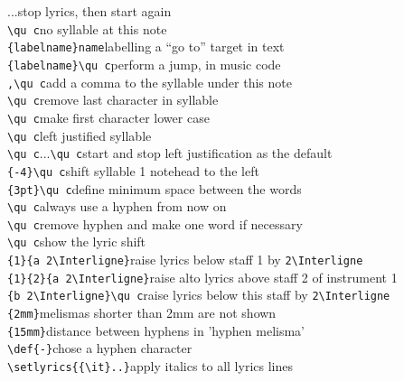 \documentclass[twoside]{article}
\begin{document}
\begin{tabbing}
...\>stop lyrics, then start again\\
\verb|\qu c|\>no syllable at this note\\[.8ex]
\verb|{labelname}name|\>labelling a ``go to'' target in text\\
\verb|{labelname}\qu c|\>perform a jump, in music code\\[.8ex]
\verb|,\qu c|\>add a comma to the syllable under this note\\
\verb|\qu c|\>remove last character in syllable\\
\verb|\qu c|\>make first character lower case\\
\verb|\qu c|\>left justified syllable\\
\verb|\qu c|...\verb|\qu c|\>start and stop left justification as the default\\
\verb|{-4}\qu c|\>shift syllable 1 notehead to the left\\[.8ex]
\verb|{3pt}\qu c|\>define minimum space between the words\\
\verb|\qu c|\>always use a hyphen from now on\\
\verb|\qu c|\>remove hyphen and make one word if necessary \\
\verb|\qu c|\>show the lyric shift\\[.8ex]
\verb|{1}{a 2\Interligne}|\>raise lyrics below staff 1 by \verb|2\Interligne|\\
\verb|{1}{2}{a 2\Interligne}|\>raise alto lyrics above staff 2 of instrument 1\\
\verb|{b 2\Interligne}\qu c|\>raise lyrics below this staff by \verb|2\Interligne|\\[.8ex]
\verb|{2mm}|\>melismas shorter than 2mm are not shown \\
\verb|{15mm}|\>distance between hyphens in 'hyphen melisma'\\
\verb|\def|\verb|{-}|\>chose a hyphen character\\
\verb|\setlyrics{|\verb|{\it}..}|\>apply italics to all lyrics lines\\

\end{tabbing}
\end{document}
